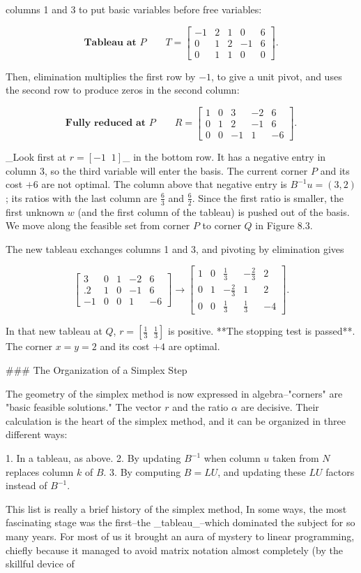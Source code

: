 columns 1 and 3 to put basic variables before free variables:

\[\textbf{Tableau at }P\qquad T=\left[\begin{array}{ccccc}-1&2&1&0&6\\ 0&1&2&-1&6\\ 0&1&1&0&0\end{array}\right].\]

Then, elimination multiplies the first row by \(-1\), to give a unit pivot, and uses the second row to produce zeros in the second column:

\[\textbf{Fully reduced at }P\qquad R=\left[\begin{array}{ccccc}1&0&3&-2&6\\ 0&1&2&-1&6\\ 0&0&-1&1&-6\end{array}\right].\]

_Look first at \(r=[-1\;\;1]\)_ in the bottom row. It has a negative entry in column 3, so the third variable will enter the basis. The current corner \(P\) and its cost \(+6\) are not optimal. The column above that negative entry is \(B^{-1}u=(3,2)\); its ratios with the last column are \(\frac{6}{3}\) and \(\frac{6}{2}\). Since the first ratio is smaller, the first unknown \(w\) (and the first column of the tableau) is pushed out of the basis. We move along the feasible set from corner \(P\) to corner \(Q\) in Figure 8.3.

The new tableau exchanges columns 1 and 3, and pivoting by elimination gives

\[\left[\begin{array}{ccccc}3&0&1&-2&6\\ .2&1&0&-1&6\\ -1&0&0&1&-6\end{array}\right]\rightarrow\left[\begin{array}{ccccc}1&0& \frac{1}{3}&-\frac{2}{3}&2\\ 0&1&-\frac{2}{3}&1&2\\ 0&0&\frac{1}{3}&\frac{1}{3}&-4\end{array}\right].\]

In that new tableau at \(Q\), \(r=[\frac{1}{3}\;\;\frac{1}{3}]\) is positive. **The stopping test is passed**. The corner \(x=y=2\) and its cost \(+4\) are optimal.

### The Organization of a Simplex Step

The geometry of the simplex method is now expressed in algebra--"corners" are "basic feasible solutions." The vector \(r\) and the ratio \(\alpha\) are decisive. Their calculation is the heart of the simplex method, and it can be organized in three different ways:

1. In a tableau, as above.
2. By updating \(B^{-1}\) when column \(u\) taken from \(N\) replaces column \(k\) of \(B\).
3. By computing \(B=LU\), and updating these \(LU\) factors instead of \(B^{-1}\).

This list is really a brief history of the simplex method, In some ways, the most fascinating stage was the first--the _tableau_--which dominated the subject for so many years. For most of us it brought an aura of mystery to linear programming, chiefly because it managed to avoid matrix notation almost completely (by the skillful device of 